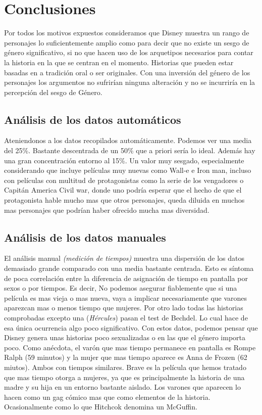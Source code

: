 \noindent %
\chapter{Conclusiones}
    Por todos los motivos expuestos consideramos que Disney muestra un rango de personajes lo suficientemente amplio como para decir que no existe un sesgo de género significativo, si no que hacen uso de los arquetipos necesarios para contar la historia en la que se centran en el momento. Historias que pueden estar basadas en a tradición oral o ser originales. Con una inversión del género de los personajes los argumentos no sufrirían ninguna alteración y no se incurriría en la percepción del sesgo de Género.
    
\section{Análisis de los datos automáticos}
    Ateniendonos a los datos recopilados automáticamente. Podemos ver una media del 25\%. Bastante descentrada de un 50\% que a priori sería lo ideal. Además hay una gran concentración entorno al 15\%. Un valor muy sesgado, especialmente considerando que incluye películas muy nuevas como Wall-e e Iron man, incluso con películas con multitud de protagonistas como la serie de los vengadores o Capitán America Civil war, donde uno podría esperar que el hecho de que el protagonista hable mucho mas que otros personajes, queda diluida en muchos mas personajes que podrían haber ofrecido mucha mas diversidad.
    
\section{Análisis de los datos manuales}
    El análisis manual \textit{(medición de tiempos)} muestra una dispersión de los datos demasiado grande comparado con una media bastante centrada. Esto es síntoma de poca correlación entre la diferencia de asignación de tiempo en pantalla por sexos o por tiempos. Es decir, No podemos asegurar fiablemente que si una película es mas vieja o mas nueva, vaya a implicar necesariamente que varones aparezcan mas o menos tiempo que mujeres.
    Por otro lado todas las historias comprobadas excepto una (\textit{Hércules}) pasan el test de Bechdel. Lo cual hace de esa única ocurrencia algo poco significativo.
    Con estos datos, podemos pensar que Disney genera unas historias poco sexualizadas o en las que el género importa poco.
    Como anécdota, el varón que mas tiempo permanece en pantalla es Rompe Ralph (59 minutos) y la mujer que mas tiempo aparece es Anna de Frozen (62 miutos). Ambos con tiempos similares.
    Brave es la película que hemos tratado que mas tiempo otorga a mujeres, ya que es principalmente la historia de una madre y su hija en un entorno bastante aislado. Los varones que aparecen lo hacen como un gag cómico mas que como elementos de la historia. Ocasionalmente como lo que Hitchcok denomina un McGuffin.
